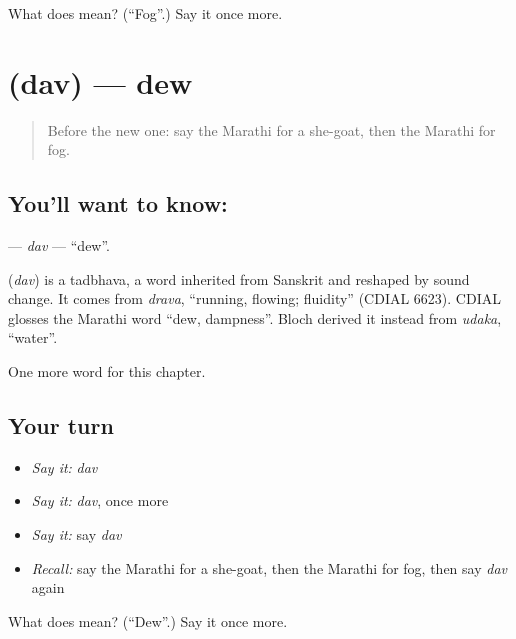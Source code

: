 \begin{tcolorbox}[breakable,colback=teal!4,colframe=teal!35!black,title={Before you move on}]
What does  mean? (\textquotedblleft{}Fog\textquotedblright{}.) Say it once more.
\end{tcolorbox}
\section[\texorpdfstring{\mr{दव} (dav)}{दव (dav)}]{ (dav) — dew}

\label{lesson:MR-C218-dav}



\begin{quote}
Before the new one: say the Marathi for a she-goat, then the Marathi for fog.
\end{quote}

\subsection*{You'll want to know: }
\textbf{} — \emph{dav} — \textquotedblleft{}dew\textquotedblright{}.

\begin{cousinweb}
\textbf{} (\emph{dav}) is a tadbhava, a word inherited from Sanskrit and reshaped by sound change. It comes from \emph{drava}, \textquotedblleft{}running, flowing; fluidity\textquotedblright{} (CDIAL 6623). CDIAL glosses the Marathi word \textquotedblleft{}dew, dampness\textquotedblright{}. Bloch derived it instead from \emph{udaka}, \textquotedblleft{}water\textquotedblright{}.
\end{cousinweb}

\begin{grammarlens}[title={What you've built}]
One more word for this chapter.
\end{grammarlens}

\subsection*{Your turn}
\begin{itemize}
\raggedright
  \item \emph{Say it:} \emph{dav}
  \item \emph{Say it:} \emph{dav}, once more
  \item \emph{Say it:} say \emph{dav}
  \item \emph{Recall:} say the Marathi for a she-goat, then the Marathi for fog, then say \emph{dav} again
\end{itemize}

\begin{tcolorbox}[breakable,colback=teal!4,colframe=teal!35!black,title={Before you move on}]
What does  mean? (\textquotedblleft{}Dew\textquotedblright{}.) Say it once more.
\end{tcolorbox}
